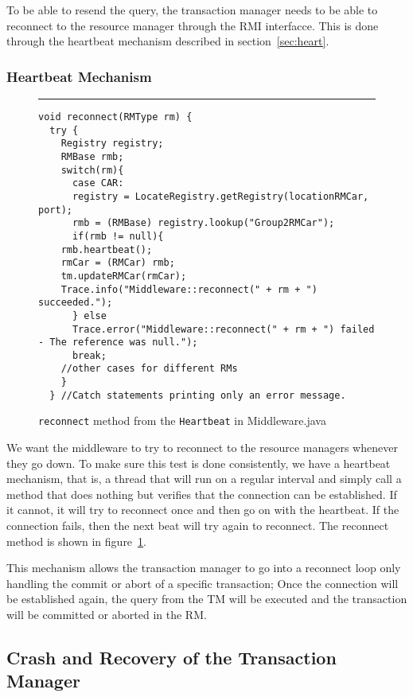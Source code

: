 \documentclass[12pt]{article}
\theoremstyle{plain}%
\theoremstyle{definition}
\theoremstyle{remark}
\newcommand{\java}[1]{{\lstinline!#1!}}
\newenvironment{figureone}[1]{%
  \def\deffigurecaption{#1}%
  \begin{figure}[htbp]%
  \begin{center}%
  \begin{minipage}{\columnwidth}%
  \hrule \vspace*{2ex}%
}{%
  \end{minipage}%
  \end{center}%
  \caption{\deffigurecaption}%
  \end{figure}%
}
\begin{document}
To be able to resend the query, the transaction manager needs to be able to
reconnect to the resource manager through the RMI interfacce. This is
done through the heartbeat mechanism described in section~\ref{sec:heart}.

\subsubsection{Heartbeat Mechanism\label{sec:heart}}

\begin{figureone}{\java{reconnect} method from the \java{Heartbeat} in Middleware.java \label{fig:heartbeat}}
\begin{lstlisting}
void reconnect(RMType rm) {
  try {
    Registry registry;
    RMBase rmb;
    switch(rm){
      case CAR:
      registry = LocateRegistry.getRegistry(locationRMCar, port);
      rmb = (RMBase) registry.lookup("Group2RMCar");
      if(rmb != null){
	rmb.heartbeat();
	rmCar = (RMCar) rmb;
	tm.updateRMCar(rmCar);
	Trace.info("Middleware::reconnect(" + rm + ") succeeded.");
      } else
      Trace.error("Middleware::reconnect(" + rm + ") failed - The reference was null.");
      break;
    //other cases for different RMs
    }
  } //Catch statements printing only an error message.
\end{lstlisting}
\end{figureone}

We want the middleware to try to reconnect to the resource managers
whenever they go down. To make sure this test is done consistently,
we have a heartbeat mechanism, that is, a thread that will run on
a regular interval and simply call a method that does nothing but
verifies that the connection can be established. If it cannot,
it will try to reconnect once and then go on with the heartbeat.
If the connection fails, then the next beat will try again to reconnect.
The reconnect method is shown in figure~\ref{fig:heartbeat}.

This mechanism allows the transaction manager to go into a reconnect
loop only handling the commit or abort of a specific transaction; Once 
the connection will be established again, the query from the TM will be 
executed and the transaction will be committed or aborted in the RM.

\subsection{Crash and Recovery of the Transaction Manager\label{sec:rectm}}
\end{document}
